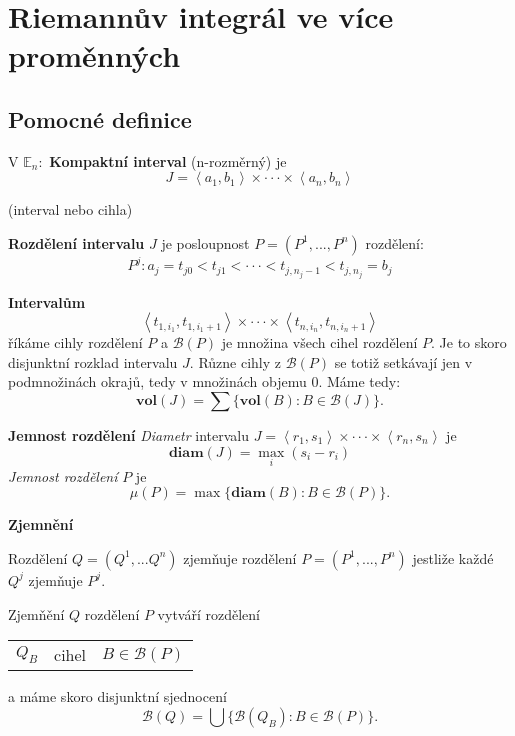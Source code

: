\documentclass[../main.tex]{subfiles}
\begin{document}
\section{Riemannův integrál ve více proměnných}
\subsection{Pomocné definice}
\hspace{1.2mm}
V $\mathbb{E}_n:$ \textbf{Kompaktní interval} (n-rozměrný) je 
\[J = \left<a_1,b_1\right> \times \cdot \cdot \cdot \times \left<a_n,b_n\right>\]
\begin{center}
(interval nebo cihla)
\end{center}
\hspace{1.2mm}
\textbf{Rozdělení intervalu} $J$ je posloupnost $P = (P^1,...,P^n)$ rozdělení:
\[P^j : a_j = t_{j0} < t_{j1} < \cdot \cdot \cdot < t_{j,n_j-1} < t_{j,n_j} = b_j\]

\noindent
\hspace{1.2mm}
\textbf{Intervalům}
\[\left<t_{1,i_1},t_{1,i_1+1}\right> \times \cdot \cdot \cdot \times \left<t_{n,i_n},t_{n,i_n+1}\right>\]
říkáme cihly rozdělení $P$ a $\mathcal{B}(P)$ je množina všech cihel rozdělení $P$. Je to skoro disjunktní rozklad intervalu $J$.
Různe cihly z $\mathcal{B}(P)$ se totiž setkávají jen v podmnožinách okrajů, tedy v množinách objemu 0. Máme tedy:
\[\textbf{vol}(J) = \sum \{\textbf{vol}(B) : B \in \mathcal{B}(J)\}.\]

\textbf{Jemnost rozdělení}
\textit{Diametr} intervalu $J = \left<r_1,s_1\right> \times \cdot \cdot \cdot \times \left<r_n,s_n\right>$ je 
\[\textbf{diam}(J) = \max_i (s_i - r_i)\]
\textit{Jemnost rozdělení} $P$ je 
\[\mu(P) = \max \{\textbf{diam}(B) : B \in \mathcal{B}(P)\}.\]

\textbf{Zjemnění}

Rozdělení $Q = (Q^1,...Q^n) $ zjemňuje rozdělení $P = (P^1,...,P^n)$ jestliže každé $Q^j$ zjemňuje $P^j$.

Zjemňění $Q$ rozdělení $P$ vytváří rozdělení
\begin{tabular}{c c c}
     $Q_B$ & cihel & $B \in \mathcal{B}(P)$  
\end{tabular}
a máme skoro disjunktní sjednocení 
\[\mathcal{B}(Q) = \bigcup \{\mathcal{B}(Q_B) : B \in \mathcal{B}(P)\}.\]
\end{document}
